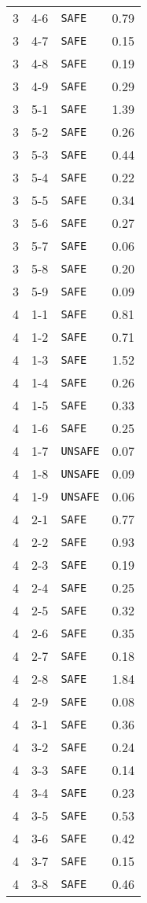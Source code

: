 \documentclass{article}%
\begin{document}
\begin{longtable}{@{}cll|r@{}}
3&4{-}6&\verb|SAFE|&0.79\\%
3&4{-}7&\verb|SAFE|&0.15\\%
3&4{-}8&\verb|SAFE|&0.19\\%
3&4{-}9&\verb|SAFE|&0.29\\%
3&5{-}1&\verb|SAFE|&1.39\\%
3&5{-}2&\verb|SAFE|&0.26\\%
3&5{-}3&\verb|SAFE|&0.44\\%
3&5{-}4&\verb|SAFE|&0.22\\%
3&5{-}5&\verb|SAFE|&0.34\\%
3&5{-}6&\verb|SAFE|&0.27\\%
3&5{-}7&\verb|SAFE|&0.06\\%
3&5{-}8&\verb|SAFE|&0.20\\%
3&5{-}9&\verb|SAFE|&0.09\\%
4&1{-}1&\verb|SAFE|&0.81\\%
4&1{-}2&\verb|SAFE|&0.71\\%
4&1{-}3&\verb|SAFE|&1.52\\%
4&1{-}4&\verb|SAFE|&0.26\\%
4&1{-}5&\verb|SAFE|&0.33\\%
4&1{-}6&\verb|SAFE|&0.25\\%
4&1{-}7&\verb|UNSAFE|&0.07\\%
4&1{-}8&\verb|UNSAFE|&0.09\\%
4&1{-}9&\verb|UNSAFE|&0.06\\%
4&2{-}1&\verb|SAFE|&0.77\\%
4&2{-}2&\verb|SAFE|&0.93\\%
4&2{-}3&\verb|SAFE|&0.19\\%
4&2{-}4&\verb|SAFE|&0.25\\%
4&2{-}5&\verb|SAFE|&0.32\\%
4&2{-}6&\verb|SAFE|&0.35\\%
4&2{-}7&\verb|SAFE|&0.18\\%
4&2{-}8&\verb|SAFE|&1.84\\%
4&2{-}9&\verb|SAFE|&0.08\\%
4&3{-}1&\verb|SAFE|&0.36\\%
4&3{-}2&\verb|SAFE|&0.24\\%
4&3{-}3&\verb|SAFE|&0.14\\%
4&3{-}4&\verb|SAFE|&0.23\\%
4&3{-}5&\verb|SAFE|&0.53\\%
4&3{-}6&\verb|SAFE|&0.42\\%
4&3{-}7&\verb|SAFE|&0.15\\%
4&3{-}8&\verb|SAFE|&0.46\\%

\end{longtable}
\end{document}
